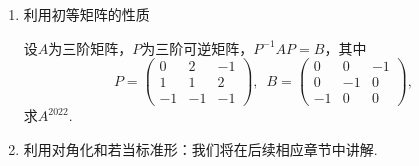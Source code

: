 \begin{enumerate}
    这一引理证明的核心是利用上一讲中讲解的基于相抵标准形的分解.在证明这一引理后我们就可以正式通过例子
    使用引理解决问题了.
    \begin{example}
        已知$M$是秩为 1 的矩阵，记$\tr(M)=b$，讨论$(aE+M)^n$的计算结果.
    \end{example}
    \begin{solution}

    \end{solution}

    \begin{example}
        已知$A$是数域$P$上的一个2阶方阵，且存在正整数$l$使得$A^l=O$，证明：$A^2=O$.
    \end{example}
    事实上，将来我们讨论幂零矩阵的时候将会进一步推广本例的结论.

    \begin{proof}
        
    \end{proof}

    \begin{example}
        已知数列$\{a_n\},\enspace\{b_n\}$满足$a_0=-1,\enspace b_0=3$，且
        \[\begin{cases}
            a_n=3a_{n-1}+b_{n-1}+2^{n-1} \\ b_n=2a_{n-1}+4b_{n-1}+2^n
        \end{cases}\]
        求$\{a_n\}\enspace\{b_n\}$的通项公式.
    \end{example}
    \begin{solution}

    \end{solution}

    \item 利用初等矩阵的性质
    \begin{example}
        设$A$为三阶矩阵，$P$为三阶可逆矩阵，$P^{-1}AP=B$，其中
        \[P=\begin{pmatrix}
            0 & 2 & -1 \\ 1 & 1 & 2 \\ -1 & -1 & -1
        \end{pmatrix},\enspace B=\begin{pmatrix}
            0 & 0 & -1 \\ 0 & -1 & 0 \\ -1 & 0 & 0
        \end{pmatrix},\]
        求$A^{2022}$.
    \end{example}
    \begin{solution}

    \end{solution}

    \item 利用对角化和若当标准形：我们将在后续相应章节中讲解.
\end{enumerate}

